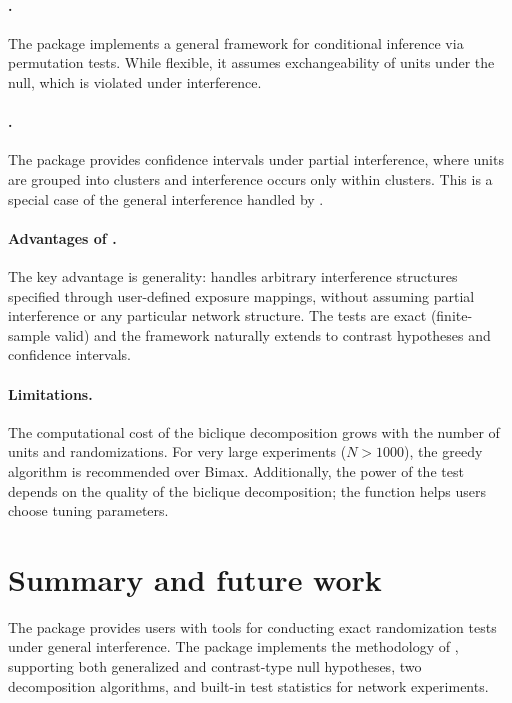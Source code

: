 \documentclass[article]{jss}
\begin{document}
\paragraph{.} The  package \citep{pkg:coin}
implements a general framework for conditional inference via permutation
tests.  While flexible, it assumes exchangeability of units under the
null, which is violated under interference.

\paragraph{.} The  package
\citep{pkg:interferenceCI} provides confidence intervals under partial
interference, where units are grouped into clusters and interference
occurs only within clusters.  This is a special case of the general
interference handled by .

\paragraph{Advantages of .}  The key advantage is
generality:  handles arbitrary interference structures
specified through user-defined exposure mappings, without assuming partial
interference or any particular network structure.  The tests are exact
(finite-sample valid) and the framework naturally extends to contrast
hypotheses and confidence intervals.

\paragraph{Limitations.}  The computational cost of the biclique
decomposition grows with the number of units and randomizations.  For
very large experiments ($N > 1000$), the greedy algorithm is recommended
over Bimax.  Additionally, the power of the test depends on the quality
of the biclique decomposition; the  function
helps users choose tuning parameters.



\section{Summary and future work} \label{sec:summary}

The  package provides  users with tools for
conducting exact randomization tests under general interference.  The
package implements the methodology of \citet{puelz2022graph}, supporting
both generalized and contrast-type null hypotheses, two decomposition
algorithms, and built-in test statistics for network experiments.
\end{document}
